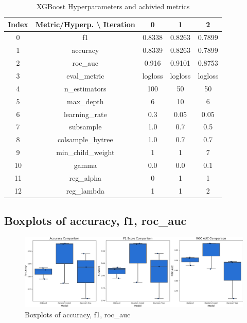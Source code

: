 \documentclass{article}%
\begin{document}
%


\begin{table}[h!]%
\caption{XGBoost Hyperparameters and achivied metrics}%
\vspace{0.2cm}%
\centering%
\begin{tabular}{|c||c||c||c||c|}%
\hline%
Index&Metric/Hyperp. \textbackslash{} Iteration&0&1&2\\%
\hline%
0&f1&0.8338&0.8263&0.7899\\%
1&accuracy&0.8339&0.8263&0.7899\\%
2&roc\_auc&0.916&0.9101&0.8753\\%
3&eval\_metric&logloss&logloss&logloss\\%
4&n\_estimators&100&50&50\\%
5&max\_depth&6&10&6\\%
6&learning\_rate&0.3&0.05&0.05\\%
7&subsample&1.0&0.7&0.5\\%
8&colsample\_bytree&1.0&0.7&0.7\\%
9&min\_child\_weight&1&1&7\\%
10&gamma&0.0&0.0&0.1\\%
11&reg\_alpha&0&1&1\\%
12&reg\_lambda&1&1&2\\%
\hline%
\end{tabular}%
\end{table}

%
\newpage%
\subsection{Boxplots of accuracy, f1, roc\_auc}%
\label{subsec:Boxplotsofaccuracy,f1,rocauc}%


\begin{figure}[h!]%
\centering%
\includegraphics[width=460px]{Results/ModelOptimization/box_plots_metrics.png}%
\caption{Boxplots of accuracy, f1, roc\_auc}%
\end{figure}

%
\end{document}
